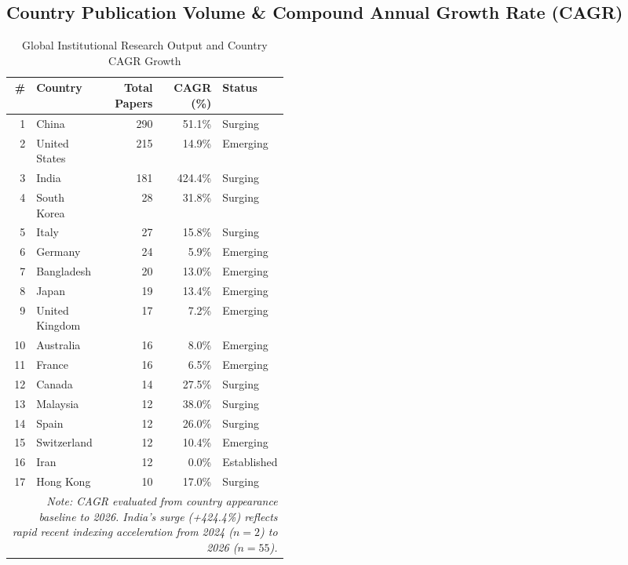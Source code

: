 \subsection{Country Publication Volume \& Compound Annual Growth Rate (CAGR)}
\begin{table}[htbp]
\caption{Global Institutional Research Output and Country CAGR Growth}
\label{tab:country_growth}
\small
\setlength{\tabcolsep}{4pt}
\begin{tabular}{r p{0.24\linewidth} r r p{0.17\linewidth}}
\toprule
\textbf{\#} & \textbf{Country} & \textbf{Total Papers} & \textbf{CAGR (\%)} & \textbf{Status} \\
\midrule
1 & China & 290 & 51.1\% & Surging \\
2 & United States & 215 & 14.9\% & Emerging \\
3 & India & 181 & 424.4\% & Surging \\
4 & South Korea & 28 & 31.8\% & Surging \\
5 & Italy & 27 & 15.8\% & Surging \\
6 & Germany & 24 & 5.9\% & Emerging \\
7 & Bangladesh & 20 & 13.0\% & Emerging \\
8 & Japan & 19 & 13.4\% & Emerging \\
9 & United Kingdom & 17 & 7.2\% & Emerging \\
10 & Australia & 16 & 8.0\% & Emerging \\
11 & France & 16 & 6.5\% & Emerging \\
12 & Canada & 14 & 27.5\% & Surging \\
13 & Malaysia & 12 & 38.0\% & Surging \\
14 & Spain & 12 & 26.0\% & Surging \\
15 & Switzerland & 12 & 10.4\% & Emerging \\
16 & Iran & 12 & 0.0\% & Established \\
17 & Hong Kong & 10 & 17.0\% & Surging \\
\bottomrule
\multicolumn{5}{p{0.95\linewidth}}{\scriptsize \textit{Note: CAGR evaluated from country appearance baseline to 2026. India's surge (+424.4\%) reflects rapid recent indexing acceleration from 2024 ($n=2$) to 2026 ($n=55$).}} \\
\end{tabular}
\end{table}